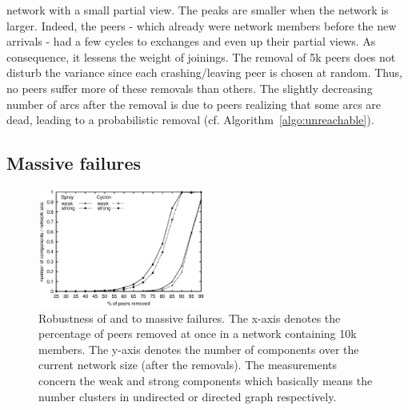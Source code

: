 \begin{asparadesc}
  network with a small partial view. The peaks are smaller when the network is
  larger. Indeed, the peers - which already were network members before the new
  arrivals - had a few cycles to exchanges and even up their partial views. As
  consequence, it lessens the weight of joinings. The removal of 5k peers does
  not disturb the variance since each crashing/leaving peer is chosen at
  random. Thus, no peers suffer more of these removals than others. The
  slightly decreasing number of arcs after the removal is due to peers
  realizing that some arcs are dead, leading to a probabilistic removal
  (cf. Algorithm~\ref{algo:unreachable}).
\end{asparadesc}

\subsection{Massive failures}
\label{subsec:resilience}

\begin{figure}
  \centering
  \includegraphics[width=0.49\textwidth]{img/resilience.eps}
  \caption{\label{fig:resilience}Robustness of \CYCLON and \SPRAY to massive
    failures. The x-axis denotes the percentage of peers removed at once in a
    network containing 10k members. The y-axis denotes the number of
    components over the current network size (after the removals). The
    measurements concern the weak and strong components which basically means
    the number clusters in undirected or directed graph respectively.}
\end{figure}

% 

